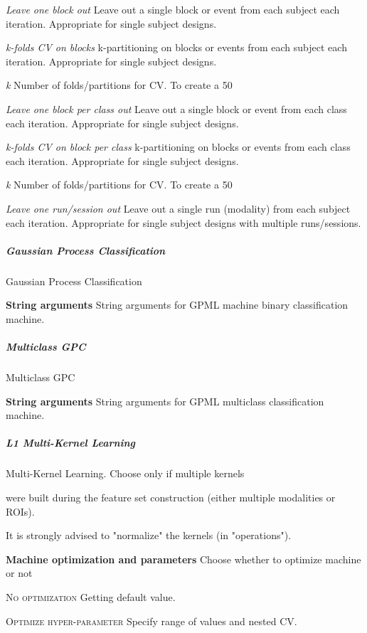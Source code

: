 \textit{Leave one block out}
Leave out a single block or event from each subject each iteration. Appropriate for single subject designs.


\textit{k-folds CV on blocks}
k-partitioning on blocks or events from each subject each iteration. Appropriate for single subject designs.


\textit{k}
Number of folds/partitions for CV. To create a 50%


\textit{Leave one block per class out}
Leave out a single block or event from each class each iteration. Appropriate for single subject designs.


\textit{k-folds CV on block per class}
k-partitioning on blocks or events from each class each iteration. Appropriate for single subject designs.


\textit{k}
Number of folds/partitions for CV. To create a 50%


\textit{Leave one run/session out}
Leave out a single run (modality) from each subject each iteration. Appropriate for single subject designs with multiple runs/sessions.


\subparagraph{Gaussian Process Classification}
Gaussian Process Classification


\textbf{String arguments}
String arguments for GPML machine binary classification machine.


\subparagraph{Multiclass GPC}
Multiclass GPC


\textbf{String arguments}
String arguments for GPML multiclass classification machine.


\subparagraph{L1 Multi-Kernel Learning}
Multi-Kernel Learning. Choose only if multiple kernels 

were built during the feature set construction (either multiple modalities or ROIs). 

It is strongly advised to "normalize" the kernels (in "operations").


\textbf{Machine optimization and parameters}
Choose whether to optimize machine or not


\textsc{No optimization}
Getting default value.


\textsc{Optimize hyper-parameter}
Specify range of values and nested CV.


